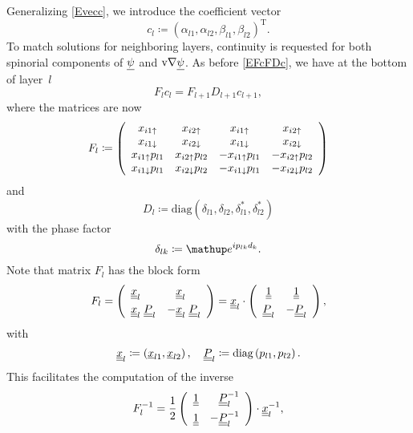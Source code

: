 Generalizing \cref{Evecc},
we introduce the coefficient vector
\begin{equation}
  c_l \coloneqq  {(\alpha_{l1}, \alpha_{l2}, \beta_{l1}, \beta_{l2})}^\text{T}.
\end{equation}
To match solutions for neighboring layers,
continuity is requested for both spinorial components
of $\underline{\psi}$ and $\text{v}{\nabla}\underline{\psi}$.
As before \cref{EFcFDc}, we have at the bottom of layer~$l$
\begin{equation}\label{EFcFDcp}
  F_l c_l = F_{l+1} D_{l+1} c_{l+1},
\end{equation}
where the matrices are now
\begin{equation}
  F_l \coloneqq  \left(\begin{array}{cccc}
    x_{i1\uparrow}      &x_{i2\uparrow}     &x_{i1\uparrow}       &x_{i2\uparrow}       \\
    x_{i1\downarrow}      &x_{i2\downarrow}     &x_{i1\downarrow}       &x_{i2\downarrow}       \\
    x_{i1\uparrow}p_{l1}&x_{i2\uparrow}p_{l2}&-x_{i1\uparrow}p_{l1}&-x_{i2\uparrow}p_{l2}\\
    x_{i1\downarrow}p_{l1}&x_{i2\downarrow}p_{l2}&-x_{i1\downarrow}p_{l1}&-x_{i2\downarrow}p_{l2}
  \end{array}\right)
\end{equation}
and
\begin{equation}
  D_l \coloneqq  \text{diag}(\delta_{l1}, \delta_{l2}, \delta_{l1}^*, \delta_{l2}^*)
\end{equation}
with the phase factor
\begin{equation}
   \delta_{l k} \coloneqq  \e^{ip_{l k}d_k}.
\end{equation}
Note that matrix $F_l$ has the block form
\begin{equation}
  F_l
  =\left(\begin{array}{ll}\underline{\underline{x}}_l&\hphantom{-}\underline{\underline{x}}_l\\[1ex]
    \underline{\underline{x}}_l\; \underline{\underline{P}}_l&-\underline{\underline{x}}_l\; \underline{\underline{P}}_l\end{array}\right)
    = \underline{\underline{x}}_l \cdot
    \left(\begin{array}{cc}\underline{\underline{1}}&\underline{\underline{1}}\\[1ex]
    \underline{\underline{P}}_l&-\underline{\underline{P}}_l\end{array}\right),
\end{equation}
with
\begin{equation}
  \underline{\underline{x}}_l \coloneqq
  \left(\underline{x}_{l1}, \underline{x}_{l2}\right),
  \quad
  \underline{\underline{P}}_l \coloneqq
  \text{diag}\left(p_{l1},p_{l2}\right).
\end{equation}
This facilitates the computation of the inverse
\begin{equation}
  F_l^{-1}
    = \frac{1}{2}
    \left(\begin{array}{cc}\underline{\underline{1}}&\hphantom{-}\underline{\underline{P}}_l^{-1}\\[1.2ex]
      \underline{\underline{1}} &-\underline{\underline{P}}_l^{-1}\end{array}\right)
      \cdot\underline{\underline{x}}_l^{-1},
\end{equation}
